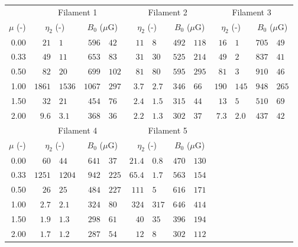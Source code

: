 \begin{tabular}{@{}rr@{ $\pm$ }lr@{ $\pm$ }lr@{ $\pm$ }lr@{ $\pm$ }lr@{ $\pm$ }lr@{ $\pm$ }l@{}}
\toprule
{} & \multicolumn{4}{c}{Filament 1}
   & \multicolumn{4}{c}{Filament 2}
   & \multicolumn{4}{c}{Filament 3} \\
\cmidrule(lr){2-5} \cmidrule(lr){6-9} \cmidrule(lr){10-13}
$\mu$ (-) & \multicolumn{2}{c}{$\eta_2$ (-)} & \multicolumn{2}{c}{$B_0$ ($\mu$G)}
          & \multicolumn{2}{c}{$\eta_2$ (-)} & \multicolumn{2}{c}{$B_0$ ($\mu$G)}
          & \multicolumn{2}{c}{$\eta_2$ (-)} & \multicolumn{2}{c}{$B_0$ ($\mu$G)} \\
\cmidrule{1-13}
0.00 & $21$ & $1$ & $596$ & $42$
     & $11$ & $8$ & $492$ & $118$
     & $16$ & $1$ & $705$ & $49$ \\
0.33 & $49$ & $11$ & $653$ & $83$
     & $31$ & $30$ & $525$ & $214$
     & $49$ & $2$ & $837$ & $41$ \\
0.50 & $82$ & $20$ & $699$ & $102$
     & $81$ & $80$ & $595$ & $295$
     & $81$ & $3$ & $910$ & $46$ \\
1.00 & $1861$ & $1536$ & $1067$ & $297$
     & $3.7$ & $2.7$ & $346$ & $66$
     & $190$ & $145$ & $948$ & $265$ \\
1.50 & $32$ & $21$ & $454$ & $76$
     & $2.4$ & $1.5$ & $315$ & $44$
     & $13$ & $5$ & $510$ & $69$ \\
2.00 & $9.6$ & $3.1$ & $368$ & $36$
     & $2.2$ & $1.3$ & $302$ & $37$
     & $7.3$ & $2.0$ & $437$ & $42$ \\

\midrule
{} & \multicolumn{4}{c}{Filament 4}
   & \multicolumn{4}{c}{Filament 5} \\
\cmidrule(lr){2-5} \cmidrule(lr){6-9}
$\mu$ (-) & \multicolumn{2}{c}{$\eta_2$ (-)} & \multicolumn{2}{c}{$B_0$ ($\mu$G)}
          & \multicolumn{2}{c}{$\eta_2$ (-)} & \multicolumn{2}{c}{$B_0$ ($\mu$G)} \\
\cmidrule{1-9}
0.00 & $60$ & $44$ & $641$ & $37$
     & $21.4$ & $0.8$ & $470$ & $130$ \\
0.33 & $1251$ & $1204$ & $942$ & $225$
     & $65.4$ & $1.7$ & $563$ & $154$ \\
0.50 & $26$ & $25$ & $484$ & $227$
     & $111$ & $5$ & $616$ & $171$ \\
1.00 & $2.7$ & $2.1$ & $324$ & $80$
     & $324$ & $317$ & $646$ & $414$ \\
1.50 & $1.9$ & $1.3$ & $298$ & $61$
     & $40$ & $35$ & $396$ & $194$ \\
2.00 & $1.7$ & $1.2$ & $287$ & $54$
     & $12$ & $8$ & $302$ & $112$ \\

\bottomrule
\end{tabular}

